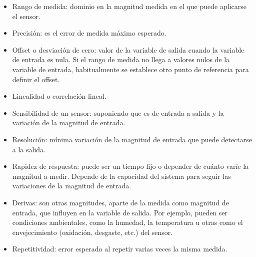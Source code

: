 				\begin{itemize}
					\item Rango de medida: dominio en la magnitud medida en el que puede aplicarse el sensor.
					
					\item Precisión: es el error de medida máximo esperado.
					
					\item Offset o desviación de cero:  valor de la variable de salida cuando la variable de entrada es nula. Si el rango de medida no llega a valores nulos de la variable de entrada, habitualmente se establece otro punto de referencia para definir el offset.
					
					\item Linealidad o correlación lineal.
					
					\item Sensibilidad de un sensor: suponiendo que es de entrada a salida y la variación de la magnitud de entrada.
					
					\item Resolución: mínima variación de la magnitud de entrada que puede detectarse a la salida.
					
					\item Rapidez de respuesta: puede ser un tiempo fijo o depender de cuánto varíe la magnitud a medir. Depende de la capacidad del sistema para seguir las variaciones de la magnitud de entrada.
					
					\newpage
					\thispagestyle{plain}
					
					\item Derivas: son otras magnitudes, aparte de la medida como magnitud de entrada, que influyen en la variable de salida. Por ejemplo, pueden ser condiciones ambientales, como la humedad, la temperatura u otras como el envejecimiento (oxidación, desgaste, etc.) del sensor.
					
					\item Repetitividad: error esperado al repetir varias veces la misma medida.
				\end{itemize}
			
